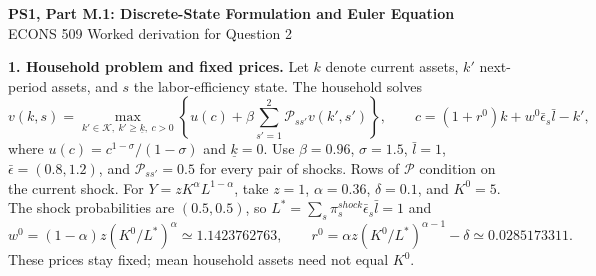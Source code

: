 \documentclass[11pt]{article}
\newcommand{\PP}{\mathcal P}
\begin{document}
\begin{center}
{\large\bfseries PS1, Part M.1: Discrete-State Formulation and Euler Equation}\\[3pt]
{\small ECONS 509 \quad Worked derivation for Question 2}
\end{center}

\textbf{1. Household problem and fixed prices.}
Let $k$ denote current assets, $k'$ next-period assets, and $s$ the labor-efficiency state.
The household solves
\begin{equation}
v(k,s)=\max_{k'\in\mathcal K,\ k'\geq\underline k,\ c>0}
\left\{u(c)+\beta\sum_{s'=1}^2\PP_{ss'}v(k',s')\right\},
\qquad c=(1+r^0)k+w^0\bar\epsilon_s\bar l-k',
\end{equation}
where $u(c)=c^{1-\sigma}/(1-\sigma)$ and $\underline k=0$.
Use $\beta=0.96$, $\sigma=1.5$, $\bar l=1$, $\bar\epsilon=(0.8,1.2)$,
and $\PP_{ss'}=0.5$ for every pair of shocks. Rows of $\PP$ condition on the current shock.
For $Y=zK^\alpha L^{1-\alpha}$, take $z=1$, $\alpha=0.36$, $\delta=0.1$, and $K^0=5$.
The shock probabilities are $(0.5,0.5)$, so $L^*=\sum_s\pi_s^{shock}\bar\epsilon_s\bar l=1$ and
\[
w^0=(1-\alpha)z(K^0/L^*)^\alpha\simeq1.1423762763,
\qquad r^0=\alpha z(K^0/L^*)^{\alpha-1}-\delta\simeq0.0285173311.
\]
These prices stay fixed; mean household assets need not equal $K^0$.
\end{document}
